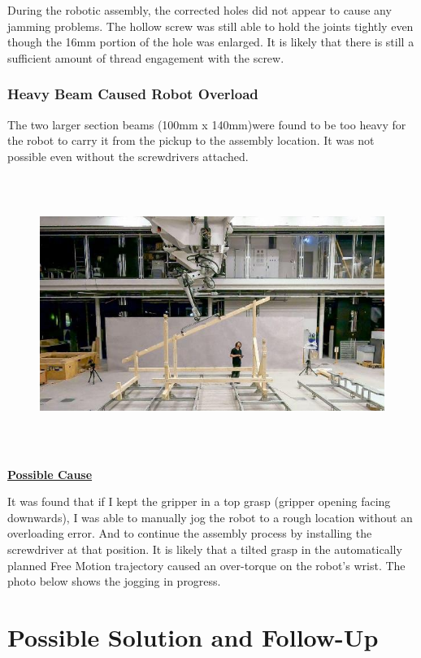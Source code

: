 \documentclass[11pt]{book}
\begin{document}
During the robotic assembly, the corrected holes did not appear to cause any jamming problems. The hollow screw was still able to hold the joints tightly even though the 16mm portion of the hole was enlarged. It is likely that there is still a sufficient amount of thread engagement with the screw.

\subsubsection{Heavy Beam Caused Robot Overload}

The two larger section beams (100mm x 140mm)were found to be too heavy for the robot to carry it from the pickup to the assembly location. It was not possible even without the screwdrivers attached.

\begin{figure}[H]
\includegraphics[width=15.92cm,height=8.96cm]{./images/image95.jpeg}
\end{figure}


\textbf{\uline{Possible Cause}}

It was found that if I kept the gripper in a top grasp (gripper opening facing downwards), I was able to manually jog the robot to a rough location without an overloading error. And to continue the assembly process by installing the screwdriver at that position. It is likely that a tilted grasp in the automatically planned Free Motion trajectory caused an over-torque on the robot's wrist. The photo below shows the jogging in progress.

\section{Possible Solution and Follow-Up}
\end{document}
